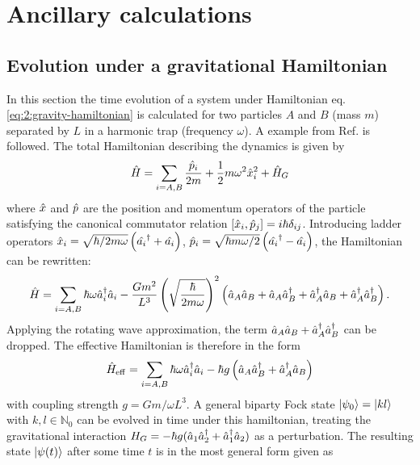 \chapter{Ancillary calculations}\label{apx:ancillary-calculations}


\section{Evolution under a gravitational Hamiltonian}\label{apx:general-state-gravitaional-hamiltonian}
In this section the time evolution of a system under Hamiltonian eq. \eqref{eq:2:gravity-hamiltonian} is calculated for two particles $A$ and $B$ (mass $m$) separated by $L$ in a harmonic trap (frequency $\omega$). A example from Ref. \cite{Carney_2018} is followed.
The total Hamiltonian describing the dynamics is given by
\begin{equation}
  \hat{H} = \sum_{i=A,B} \frac{\hat{p}_i}{2m} + \frac{1}{2} m \omega^2 \hat{x}_i^2 + \hat{H}_G
\end{equation}
where $\hat{x}$ and $\hat{p}$ are the position and momentum operators of the particle satisfying the canonical commutator relation $[\hat{x}_i, \hat{p}_j] = i \hbar \delta_{ij}$.
Introducing ladder operators $\hat{x}_i = \sqrt{\hbar/2m\omega} \left(\hat{a_i}^\dagger + \hat{a_i}\right)$, $\hat{p}_i = \sqrt{\hbar m \omega /2} \left(\hat{a_i}^\dagger - \hat{a_i}\right)$, the Hamiltonian can be rewritten:
\begin{equation}
  \hat{H} = \sum_{i=A,B} \hbar \omega \hat{a}_i^\dagger\hat{a}_i - \frac{Gm^2}{L^3}\left(\sqrt{\frac{\hbar}{2m\omega}}\right)^2 \left(\hat{a}_A\hat{a}_B + \hat{a}_A\hat{a}^\dagger_B + \hat{a}^\dagger_A\hat{a}_B + \hat{a}^\dagger_A\hat{a}^\dagger_B\right) .
\end{equation}
Applying the rotating wave approximation, the term $\hat{a}_A\hat{a}_B + \hat{a}^\dagger_A\hat{a}^\dagger_B$ can be dropped. The effective Hamiltonian is therefore in the form
\begin{equation}
  \hat{H}_\mathrm{eff} = \sum_{i=A,B} \hbar \omega \hat{a}_i^\dagger\hat{a}_i - \hbar g \left(\hat{a}_A\hat{a}^\dagger_B + \hat{a}^\dagger_A\hat{a}_B\right)
\end{equation}
with coupling strength $g=Gm/\omega L^3$.
A general biparty Fock state $\ket{\psi_0} = \ket{kl}$ with $k, l \in \mathbb{N}_0$ can be evolved in time under this hamiltonian, treating the gravitational interaction $H_G = -\hbar g (\hat{a}_1\hat{a}_2^\dagger + \hat{a}_1^\dagger\hat{a}_2)$ as a perturbation. 
The resulting state $\ket{\psi(t)}$ after some time $t$ is in the most general form given as
